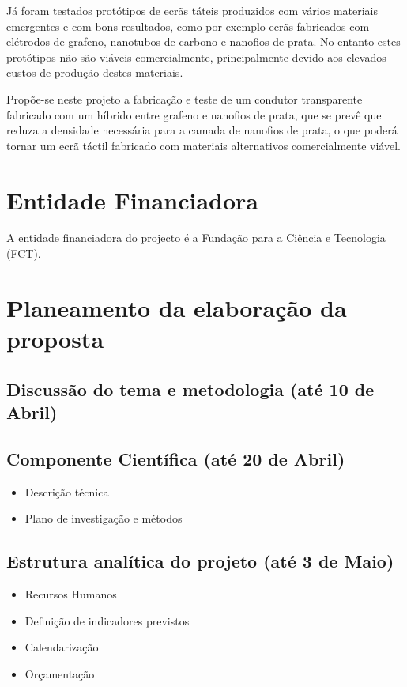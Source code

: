 \documentclass[%
	nofootinbib,
	amsmath,amssymb,
	aps,
	12pt,
	a4paper
]{article}
\begin{document}
Já foram testados protótipos de ecrãs táteis produzidos com vários materiais emergentes e com bons resultados, como por exemplo ecrãs fabricados com elétrodos de grafeno, nanotubos de carbono e nanofios de prata. No entanto estes protótipos não são viáveis comercialmente, principalmente devido aos elevados custos de produção destes materiais.

Propõe-se neste projeto a fabricação e teste de um condutor transparente fabricado com um híbrido entre grafeno e nanofios de prata, que se prevê que reduza a densidade necessária para a camada de nanofios de prata, o que poderá tornar um ecrã táctil fabricado com materiais alternativos comercialmente viável.

\section{Entidade Financiadora}
A entidade financiadora do projecto é a Fundação para a Ciência e Tecnologia (FCT).

\section{Planeamento da elaboração da proposta}

\subsection{Discussão do tema e metodologia (até 10 de Abril)}

\subsection{Componente Científica (até 20 de Abril)}
\begin{itemize}
	\item Descrição técnica
	\item Plano de investigação e métodos
\end{itemize}

\subsection{Estrutura analítica do projeto (até 3 de Maio)}
\begin{itemize}
	\item Recursos Humanos
	\item Definição de indicadores previstos
	\item Calendarização
	\item Orçamentação
\end{itemize}
\end{document}
